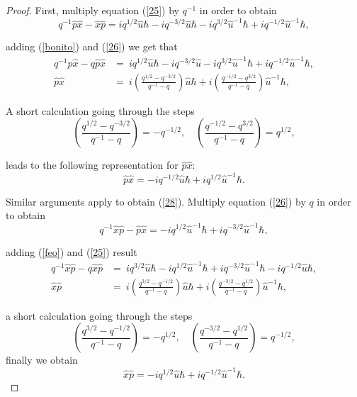\documentclass[12pt,a4paper]{article}
\theoremstyle{plain}
\theoremstyle{definition}
\theoremstyle{remark}
\begin{document}
\begin{proof}
First, multiply equation (\ref{25}) by $q^{-1}$ in order to obtain
\begin{equation}\label{bonito}
        q^{-1}\hat{p}\hat{x}-\hat{x}\hat{p} =iq^{1/2}\hat{u}\hbar-iq^{-3/2}\hat{u}\hbar-iq^{3/2}\hat{u}^{-1}\hbar+iq^{-1/2}\hat{u}^{-1}\hbar,
\end{equation}

adding (\ref{bonito}) and (\ref{26}) we get that
\begin{align*}
    q^{-1}\hat{p}\hat{x}-q\hat{p}\hat{x} & = \ iq^{1/2}\hat{u}\hbar-iq^{-3/2}\hat{u}-iq^{3/2}\hat{u}^{-1}\hbar+iq^{-1/2}\hat{u}^{-1}\hbar,\\
    \hat{p}\hat{x} & = \ i\left(\frac{q^{1/2}-q^{-3/2}}{q^{-1}-q}\right)\hat{u}\hbar+i\left(\frac{q^{-1/2}-q^{3/2}}{q^{-1}-q}\right)\hat{u}^{-1}\hbar,
\end{align*}

A short calculation going through the steps
\begin{equation*}
  \left(\frac{q^{1/2}-q^{-3/2}}{q^{-1}-q}\right)=-q^{-1/2}, \quad  \left(\frac{q^{-1/2}-q^{3/2}}{q^{-1}-q}\right)=q^{1/2},
\end{equation*}

leads to the following representation for $\hat{p}\hat{x}$:
\begin{equation*}
    \hat{p}\hat{x}=-iq^{-1/2}\hat{u}\hbar+iq^{1/2}\hat{u}^{-1}\hbar .
\end{equation*}

Similar arguments apply to obtain (\ref{28}). Multiply equation (\ref{26}) by $q$ in order to obtain
\begin{equation}\label{feo}
   q^{-1}\hat{x}\hat{p}-\hat{p}\hat{x} = -iq^{1/2}\hat{u}^{-1}\hbar+iq^{-3/2}\hat{u}^{-1}\hbar,
\end{equation}

adding (\ref{feo}) and (\ref{25}) result
\begin{align*}
    q^{-1}\hat{x}\hat{p}-q\hat{x}\hat{p} & = \ iq^{3/2}\hat{u}\hbar-iq^{1/2}\hat{u}^{-1}\hbar+iq^{-3/2}\hat{u}^{-1}\hbar-iq^{-1/2}\hat{u}\hbar,\\
    \hat{x}\hat{p} & = \ i\left(\frac{q^{3/2}-q^{-1/2}}{q^{-1}-q}\right)\hat{u}\hbar+i\left(\frac{q^{-3/2}-q^{1/2}}{q^{-1}-q}\right)\hat{u}^{-1}\hbar,
\end{align*}

a short calculation going through the steps
\begin{equation*}
  \left(\frac{q^{3/2}-q^{-1/2}}{q^{-1}-q}\right)=-q^{1/2}, \quad  \left(\frac{q^{-3/2}-q^{1/2}}{q^{-1}-q}\right)=q^{-1/2},
\end{equation*}
finally we obtain
\begin{equation*}
    \hat{x}\hat{p}=-iq^{1/2}\hat{u}\hbar+iq^{-1/2}\hat{u}^{-1}\hbar.
\end{equation*}
\end{proof}
\end{document}
